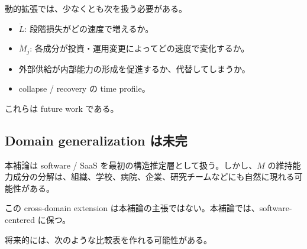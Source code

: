 \documentclass[12pt,a4paper]{article}
\begin{document}
動的拡張では、少なくとも次を扱う必要がある。

\begin{itemize}
\tightlist
\item
  \(\dot L\): 段階損失がどの速度で増えるか。
\item
  \(\dot M_j\): 各成分が投資・運用変更によってどの速度で変化するか。
\item
  外部供給が内部能力の形成を促進するか、代替してしまうか。
\item
  collapse / recovery の time profile。
\end{itemize}

これらは future work である。

\subsection{Domain generalization は未完}\label{domain-generalization-ux306fux672aux5b8c}

本補論は software / SaaS を最初の構造推定層として扱う。しかし、\(M\) の維持能力成分の分解は、組織、学校、病院、企業、研究チームなどにも自然に現れる可能性がある。

この cross-domain extension は本補論の主張ではない。本補論では、software-centered に保つ。

将来的には、次のような比較表を作れる可能性がある。
\end{document}
